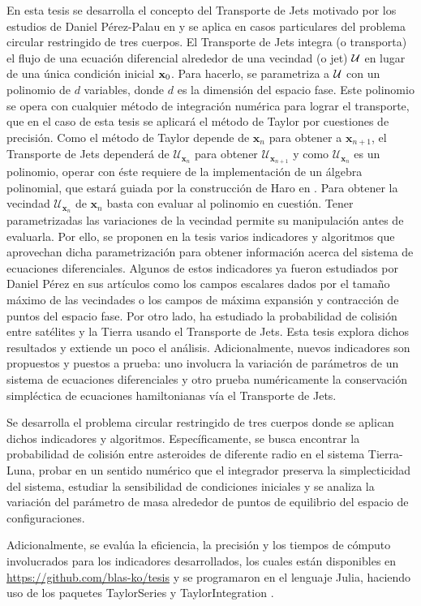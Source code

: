 En esta tesis se desarrolla el concepto del Transporte de Jets motivado por los estudios de Daniel Pérez-Palau en \cite{Perez2013, Perez2015} y se aplica en casos particulares del problema circular restringido de tres cuerpos. El Transporte de Jets integra (o transporta) el flujo de una ecuación diferencial alrededor de una vecindad (o jet) $\mathcal{U}$ en lugar de una única  condición inicial $\mathbf{x}_0$. Para hacerlo, se parametriza a $\mathcal{U}$ con un polinomio de $d$ variables, donde $d$ es la dimensión del espacio fase. Este polinomio se opera con cualquier método de integración numérica para lograr el transporte, que en el caso de esta tesis se aplicará el método de Taylor por cuestiones de precisión. Como el método de Taylor depende de $\mathbf{x}_n$ para obtener a $\mathbf{x}_{n+1}$, el Transporte de Jets dependerá de $\mathcal{U}_{\mathbf{x}_n}$ para obtener $\mathcal{U}_{\mathbf{x}_{n+1}}$ y como $\mathcal{U}_{\mathbf{x}_n}$ es un polinomio, operar con éste requiere de la implementación de un álgebra polinomial, que estará guiada por la construcción de Haro en \cite{Haro2009}. Para obtener la vecindad $\mathcal{U}_{\mathbf{x}_n}$ de $\mathbf{x}_n$ basta con evaluar al polinomio en cuestión. Tener parametrizadas las variaciones de la vecindad permite su manipulación antes de evaluarla. Por ello, se proponen en la tesis varios indicadores y algoritmos que aprovechan dicha parametrización para obtener información acerca del sistema de ecuaciones diferenciales. Algunos de estos indicadores ya fueron estudiados por Daniel Pérez en sus artículos como los campos escalares dados por el tamaño máximo de las vecindades o los campos de máxima expansión y contracción de puntos del espacio fase. Por otro lado, ha estudiado la probabilidad de colisión entre satélites y la Tierra usando el Transporte de Jets. Esta tesis explora dichos resultados y extiende un poco el análisis. Adicionalmente, nuevos indicadores son propuestos y puestos a prueba: uno involucra la variación de parámetros de un sistema de ecuaciones diferenciales y otro prueba numéricamente la conservación simpléctica de ecuaciones hamiltonianas vía el Transporte de Jets.


Se desarrolla el problema circular restringido de tres cuerpos donde se aplican dichos indicadores y algoritmos. Específicamente, se busca encontrar la probabilidad de colisión entre asteroides de diferente radio en el sistema Tierra-Luna, probar en un sentido numérico que el integrador preserva la simplecticidad del sistema, estudiar la sensibilidad de condiciones iniciales y se analiza la variación del parámetro de masa alrededor de puntos de equilibrio del espacio de configuraciones.  

Adicionalmente, se evalúa la eficiencia, la precisión y los tiempos de cómputo involucrados para los indicadores desarrollados, los cuales están disponibles en \href{https://github.com/blas-ko/tesis}{https://github.com/blas-ko/tesis} y se programaron en el lenguaje Julia, haciendo uso de los paquetes \textsf{TaylorSeries} \cite{TaylorSeries} y \textsf{TaylorIntegration} \cite{TaylorIntegration}. 
